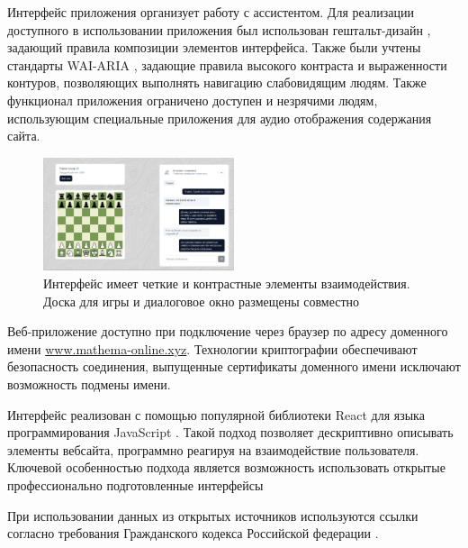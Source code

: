 Интерфейс приложения организует работу с ассистентом. Для реализации доступного в использовании приложения был использован 
гештальт-дизайн \cite{wertheimer1938laws}, задающий правила композиции элементов интерфейса. Также были учтены
стандарты WAI-ARIA \cite{craig2009accessible}, задающие правила высокого контраста и выраженности контуров, позволяющих выполнять навигацию слабовидящим людям. 
Также функционал приложения ограничено доступен и незрячими людям, использующим специальные приложения для аудио отображения
содержания сайта.

\begin{figure}[h]
    \centering
    \includegraphics[width=0.5\textwidth]{assets/work/games/interface.png}
    \caption{Интерфейс имеет четкие и контрастные элементы взаимодействия. Доска для игры и диалоговое окно размещены совместно }
    \label{chess}
\end{figure}

Веб-приложение доступно при подключение через браузер по адресу доменного имени \url{www.mathema-online.xyz}. 
Технологии криптографии обеспечивают безопасность соединения, выпущенные сертификаты доменного имени 
исключают возможность подмены имени.

Интерфейс реализован с помощью популярной библиотеки React для языка программирования JavaScript \cite{ackenheimer2015introduction}.
Такой подход позволяет дескриптивно описывать элементы вебсайта, программно реагируя на взаимодействие пользователя. 
Ключевой особенностью подхода является возможность использовать открытые профессионально подготовленные интерфейсы 

При использовании данных из открытых источников используются ссылки согласно требования Гражданского кодекса
Российской федерации \cite{law1274} \cite{law1260}.



